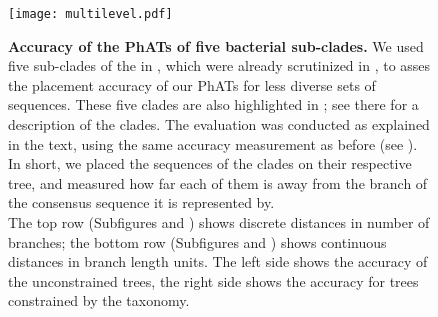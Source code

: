 \begin{figure}[hpbt]
    \centering
    \texttt{[image: multilevel.pdf]}
    \begin{subfigure}{0pt}
        \label{fig:multilevel:sub:edge_unconstr}
    \end{subfigure}
    \begin{subfigure}{0pt}
        \label{fig:multilevel:sub:edge_constr}
    \end{subfigure}
    \begin{subfigure}{0pt}
        \label{fig:multilevel:sub:branch_unconstr}
    \end{subfigure}
    \begin{subfigure}{0pt}
        \label{fig:multilevel:sub:branch_constr}
    \end{subfigure}
    \caption[Accuracy of the \acsp{PhAT} of five bacterial sub-clades]{
        \textbf{Accuracy of the \acsp{PhAT} of five bacterial sub-clades.}
        We used five sub-clades of the  in ,
        which were already scrutinized in \cite{Kozlov2016},
        to asses the placement accuracy of our \acp{PhAT} for less diverse sets of sequences.
        These five clades are also highlighted in ;
        see there for a description of the clades.
        The evaluation was conducted as explained in the text,
        using the same accuracy measurement as before 
        (see ).
        In short, we placed the  sequences of the clades on their respective tree,
        and measured how far each of them is away from the branch of the consensus sequence it is represented by.
        \\
        The top row (Subfigures  and )
        shows discrete distances in number of branches;
        the bottom row (Subfigures  and )
        shows continuous distances in branch length units.
        The left side shows the accuracy of the unconstrained trees,
        the right side shows the accuracy for trees constrained by the  taxonomy.
    }
    \label{fig:multilevel}
\end{figure}

